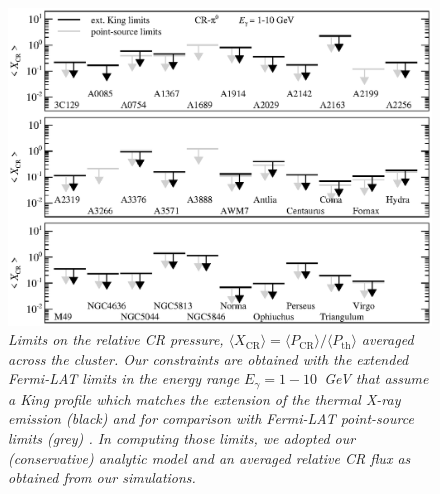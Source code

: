 \documentclass[10pt,aps,pra,reprint,amsmath,amsfonts,amssymb,showpacs,nofootinbib,floatfix]{revtex4-1}
\newcommand{\Fermi}{{\em Fermi}\xspace}
\newcommand{\rmn}{\mathrm}
\newcommand{\bra}{\langle}
\newcommand{\ket}{\rangle}
\begin{document}
\begin{figure}
\begin{minipage}{2.0\columnwidth}
  \includegraphics[width=0.99\columnwidth]{figures/XCR.Fermi.eps}
  \caption{\it Limits on the relative CR pressure, $\bra X_\rmn{CR}\ket = \bra
    P_\rmn{CR} \ket / \bra P_\rmn{th}\ket$ averaged across the cluster. Our
    constraints are obtained with the extended \Fermi-LAT limits in the energy
    range $E_\gamma=1-10$~GeV that assume a King profile which matches the
    extension of the thermal X-ray emission (black) and for comparison with
    \Fermi-LAT point-source limits (grey) \cite{2010ApJ...717L..71A}. In
    computing those limits, we adopted our (conservative) analytic model
    \cite{2010MNRAS.409..449P} and an averaged relative CR flux as obtained from
    our simulations.}
 \label{fig:XCR}
\end{minipage}
\end{figure}
\end{document}
